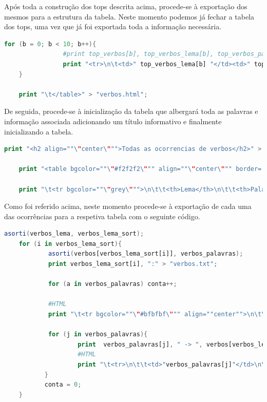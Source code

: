 \documentclass[a4paper]{article}
\begin{document}
\par Após toda a construção dos tops descrita acima, procede-se à exportação dos mesmos para a estrutura da tabela. Neste momento podemos já fechar a tabela dos tops, uma vez que já foi exportada toda a informação necessária.

\begin{lstlisting}[language=Awk, caption=Exportação dos dados dos verbos para a tabela top e exportação das tags de fecho da mesma. Análogo para as outras componentes.]
	for (b = 0; b < 10; b++){
                #print top_verbos[b], top_verbos_lema[b], top_verbos_palavra[b];
                print "<tr>\n\t<td>" top_verbos_lema[b] "</td><td>" top_verbos_palavra[b] "</td><td>"top_verbos[b]"</td>\n</tr>\n" > "verbos.html";
    }
    
    print "\t</table>" > "verbos.html";
\end{lstlisting}

\par De seguida, procede-se à inicialização da tabela que albergará toda as palavras e informação associada adicionando um título informativo e finalmente inicializando a tabela.

\begin{lstlisting}[language=Awk, caption=Inicialização da tabela completa de ocorrências para o caso específico dos verbos. Análogo para as outras componentes.]
    print "<h2 align=""\"center\""">Todas as ocorrencias de verbos</h2>" > "verbos.html";

    print "<table bgcolor=""\"#f2f2f2\""" align=""\"center\""" border='3'>" > "verbos.html"

    print "\t<tr bgcolor=""\"grey\""">\n\t\t<th>Lema</th>\n\t\t<th>Palavra</th>\n\t\t<th>Ocorrencias</th>\n\t</tr>" > "verbos.html"
\end{lstlisting}

\par Como foi referido acima, neste momento procede-se à exportação de cada uma das ocorrências para a respetiva tabela com o seguinte código.

\begin{lstlisting}[language=Awk, caption=Exportação de cada uma das ocorrências de palavra e respetivas informações associadas para a tabela completa de palavras.]
    asorti(verbos_lema, verbos_lema_sort); 
    for (i in verbos_lema_sort){
            asorti(verbos[verbos_lema_sort[i]], verbos_palavras);
            print verbos_lema_sort[i], ":" > "verbos.txt";

            for (a in verbos_palavras) conta++;

            #HTML
            print "\t<tr bgcolor=""\"#bfbfbf\""" align=""center"">\n\t\t<td rowspan="conta+1">"verbos_lema_sort[i]"</td>\n\t</tr>" > "verbos.html";

            for (j in verbos_palavras){
                    print  verbos_palavras[j], " -> ", verbos[verbos_lema_sort[i]][verbos_palavras[j]] > "verbos.txt";
                    #HTML
                    print "\t<tr>\n\t\t<td>"verbos_palavras[j]"</td>\n\t\t<td>"verbos[verbos_lema_sort[i]][verbos_palavras[j]]"</td>\n\t</tr>" > "verbos.html";
           }
           conta = 0;
    }
\end{lstlisting}
\end{document}
